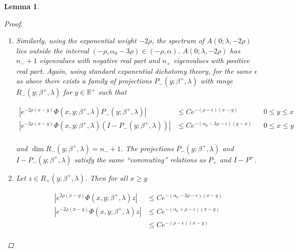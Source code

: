 \documentclass[12pt]{article}
\def\R{{\mathbb R}}
\newtheorem{lemma}{Lemma}
\begin{document}
\begin{lemma}
\begin{proof}
\begin{enumerate}
\begin{align*}
e^{2 \rho (x - y)} \Phi(x, y; \beta^+, \lambda)P_+(y; \beta^+, \lambda) 
&= P_+(x; \beta^+, \lambda) e^{2 \rho (x - y)} \Phi(x, y; \beta^+, \lambda) \\
e^{2 \rho (x - y)} \Phi(x, y; \beta^+, \lambda)(I - P_+)(y; \beta^+, \lambda) 
&= (I - P_+(x; \beta^+, \lambda))e^{2 \rho (x - y)} \Phi(x, y; \beta^+, \lambda) 
\end{align*}

We can cancel the $e^{2 \rho (x - y)}$ term to get 

\begin{align*}
\Phi(x, y; \beta^+, \lambda)P_+(y; \beta^+, \lambda) 
&= P_+(x; \beta^+, \lambda) \Phi(x, y; \beta^+, \lambda) \\
\Phi(x, y; \beta^+, \lambda)(I - P_+)(y; \beta^+, \lambda) 
&= (I - P_+(x; \beta^+, \lambda)) \Phi(x, y; \beta^+, \lambda) 
\end{align*}


\item Similarly, using the exponential weight $-2 \rho$, the spectrum of $A(0; \lambda, -2 \rho)$ lies outside the interval $(-\rho, \alpha_0 - 3 \rho) \in (-\rho, \alpha)$. $A(0; \lambda, -2 \rho)$ has $n_- + 1$ eigenvalues with negative real part and $n_+$ eigenvalues with positive real part. Again, using standard exponential dichotomy theory, for the same $\epsilon$ as above there exists a family of projections $P_-(y; \beta^+, \lambda)$ with range $R_-(y; \beta^+, \lambda)$ for $y \in \R^+$ such that

\begin{align*}
|e^{-2 \rho (x - y)}\Phi(x, y; \beta^+, \lambda)P_-(y; \beta^+, \lambda)| &\leq C e^{-(\rho - \epsilon)(x - y)} && 0 \leq y \leq x \\
|e^{-2 \rho (x - y)}\Phi(x, y; \beta^+, \lambda)(I - P_-(y; \beta^+, \lambda))| &\leq C e^{-(\alpha_0 - 3 \rho - \epsilon)(y - x)} && 0 \leq x \leq y \\
\end{align*}

and $\dim R_-(y; \beta^+, \lambda) = n_- + 1$. The projections $P_-(y; \beta^+, \lambda)$ and $I - P_-(y; \beta^+, \lambda)$ satisfy the same ``commuting'' relations as $P_+$ and $I - P^+$.

\item Let $z \in R_+(y; \beta^+, \lambda)$. Then for all $x \geq y$

\begin{align*}
|e^{2 \rho (x - y)} \Phi(x, y; \beta^+, \lambda)z| &\leq C e^{-(\alpha_0 - 3 \rho - \epsilon)(x - y)} \\
|e^{-2 \rho (x - y)} \Phi(x, y; \beta^+, \lambda)z| &\leq C e^{-(\alpha_0 + \rho - \epsilon)(x - y)} \\
&\leq C e^{-(\rho - \epsilon)(x - y)} \\
\end{align*}


\end{enumerate}
\end{proof}
\end{lemma}
\end{document}
